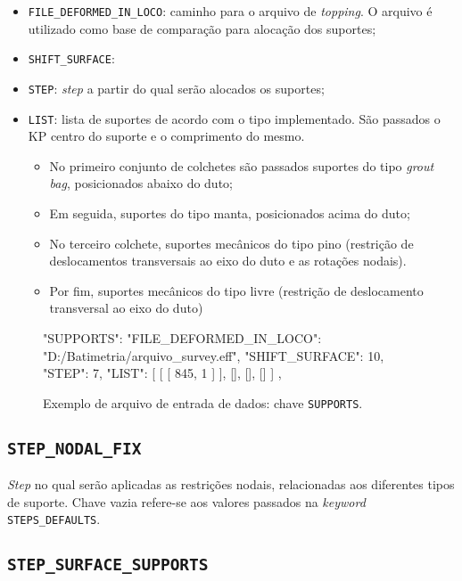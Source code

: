 \begin{itemize}
  \item \texttt{FILE\_DEFORMED\_IN\_LOCO}: caminho para o arquivo de \textit{topping}. O arquivo é utilizado como base de comparação para alocação dos suportes;
  \item \texttt{SHIFT\_SURFACE}: %
  \item \texttt{STEP}: \textit{step} a partir do qual serão alocados os suportes;
  \item \texttt{LIST}: lista de suportes de acordo com o tipo implementado. São passados o KP centro do suporte e o comprimento do mesmo.
  \begin{itemize}
    \item No primeiro conjunto de colchetes são passados suportes do tipo \textit{grout bag}, posicionados abaixo do duto;
    \item Em seguida, suportes do tipo manta, posicionados acima do duto;
    \item No terceiro colchete, suportes mecânicos do tipo pino (restrição de deslocamentos transversais ao eixo do duto e as rotações nodais).
    \item Por fim, suportes mecânicos do tipo livre (restrição de deslocamento transversal ao eixo do duto)
  \end{itemize}
\end{itemize}

\begin{figure}
\caption{Exemplo de arquivo de entrada de dados: chave \texttt{SUPPORTS}.\label{lst:supports}}
\begin{jsoncode}
{
  "SUPPORTS": {
    "FILE_DEFORMED_IN_LOCO": "D:/Batimetria/arquivo_survey.eff",
    "SHIFT_SURFACE": 10,
    "STEP": 7,
    "LIST": [
      [
        [
          845,
          1
        ]
      ],
      [],
      [],
      []
    ]
  },
}
\end{jsoncode}
\end{figure}


\subsection{\texttt{STEP\_NODAL\_FIX}}

\textit{Step} no qual serão aplicadas as restrições nodais, relacionadas aos diferentes tipos de suporte. Chave vazia refere-se aos valores passados na \textit{keyword} \texttt{STEPS\_DEFAULTS}.

\subsection{\texttt{STEP\_SURFACE\_SUPPORTS}}

